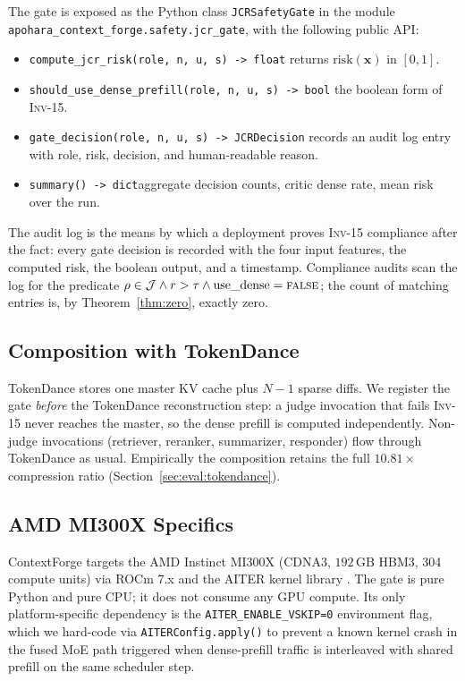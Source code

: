 \documentclass[10pt,twocolumn]{article}
\newcommand{\INV}[1]{\textsc{Inv-#1}}
\newcommand{\Risk}{\mathrm{risk}}
\newcommand{\Judge}{\mathcal{J}}
\newcommand{\code}[1]{\texttt{\small #1}}
\begin{document}
The gate is exposed as the Python class \code{JCRSafetyGate} in the
module \code{apohara\_context\_forge.safety.jcr\_gate}, with the
following public API:

\begin{itemize}
  \item \code{compute\_jcr\_risk(role, n, u, s) -> float}\textemdash
        returns $\Risk(\mathbf{x})$ in $[0, 1]$.
  \item \code{should\_use\_dense\_prefill(role, n, u, s) -> bool}\textemdash
        the boolean form of \INV{15}.
  \item \code{gate\_decision(role, n, u, s) -> JCRDecision}\textemdash
        records an audit log entry with role, risk, decision, and
        human-readable reason.
  \item \code{summary() -> dict}\textemdash aggregate decision counts,
        critic dense rate, mean risk over the run.
\end{itemize}

The audit log is the means by which a deployment proves \INV{15}
compliance after the fact: every gate decision is recorded with the four
input features, the computed risk, the boolean output, and a timestamp.
Compliance audits scan the log for the predicate
$\rho \in \Judge \wedge r > \tau \wedge \mathrm{use\_dense} = \textsc{false}$;
the count of matching entries is, by Theorem~\ref{thm:zero}, exactly zero.

\subsection{Composition with TokenDance}
\label{sec:impl:tokendance}

TokenDance \cite{tokendance} stores one master KV cache plus $N-1$ sparse
diffs. We register the gate \emph{before} the TokenDance reconstruction
step: a judge invocation that fails \INV{15} never reaches the master, so
the dense prefill is computed independently. Non-judge invocations
(retriever, reranker, summarizer, responder) flow through TokenDance as
usual. Empirically the composition retains the full $10.81\times$
compression ratio (Section~\ref{sec:eval:tokendance}).

\subsection{AMD MI300X Specifics}
\label{sec:impl:mi300x}

ContextForge targets the AMD Instinct MI300X (CDNA3, $192\,\mathrm{GB}$
HBM3, 304 compute units) via ROCm 7.x and the AITER kernel library
\cite{aiter}. The gate is pure Python and pure CPU; it does not consume any
GPU compute. Its only platform-specific dependency is the
\texttt{AITER\_ENABLE\_VSKIP=0} environment flag, which we hard-code via
\code{AITERConfig.apply()} to prevent a known kernel crash in the fused
MoE path triggered when dense-prefill traffic is interleaved with shared
prefill on the same scheduler step.
\end{document}
